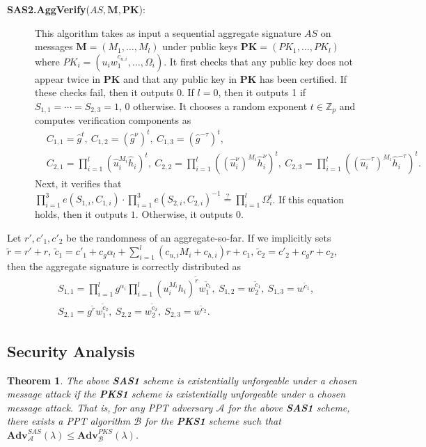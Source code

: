 \documentclass[11pt,letterpaper]{article}
\newcommand{\vect}[1]{\mathbf{#1}}
\newtheorem{theorem}{Theorem}[section]
\newcommand{\Z}{\mathbb{Z}}
\newcommand{\Adv}{\textbf{Adv}}
\newcommand{\mc}[1]{\mathcal{#1}}
\newcommand{\tb}[1]{\textbf{#1}}
\begin{document}
\begin{description}
\item [\tb{SAS2.AggVerify}($AS, \vect{M}, \vect{PK}$):] This algorithm
    takes as input a sequential aggregate signature $AS$ on messages
    $\vect{M} = (M_1, \ldots, M_l)$ under public keys $\vect{PK} = (PK_1,
    \ldots, PK_l)$ where $PK_i = (u_i w_1^{c_{u,i}}, \ldots, \Omega_i)$. It
    first checks that any public key does not appear twice in $\vect{PK}$
    and that any public key in $\vect{PK}$ has been certified. If these
    checks fail, then it outputs 0. If $l=0$, then it outputs 1 if $S_{1,1}
    = \cdots = S_{2,3} = 1$, 0 otherwise. It chooses a random exponent $t
    \in \Z_p$ and computes verification components as
    \begin{align*}
    &   C_{1,1} = \hat{g}^t,~
        C_{1,2} = (\hat{g}^{\nu})^t,~
        C_{1,3} = (\hat{g}^{-\tau})^t, \\
    &   C_{2,1} = \prod_{i=1}^l (\hat{u}_i^{M_i} \hat{h}_i)^t,~
        C_{2,2} = \prod_{i=1}^l ((\hat{u}_i^{\nu})^{M_i} \hat{h}_i^{\nu})^t,~
        C_{2,3} = \prod_{i=1}^l ((\hat{u}_i^{-\tau})^{M_i} \hat{h}_i^{-\tau})^t.
    \end{align*}
    Next, it verifies that $\prod_{i=1}^3 e(S_{1,i}, C_{1,i}) \cdot
    \prod_{i=1}^3 e(S_{2,i}, C_{2,i})^{-1} \stackrel{?}{=} \prod_{i=1}^l
    \Omega_i^t$. If this equation holds, then it outputs $1$. Otherwise, it
    outputs $0$.
\end{description}

Let $r', c'_1, c'_2$ be the randomness of an aggregate-so-far. If we
implicitly sets $\tilde{r} = r' + r,~ \tilde{c}_1 = c'_1 + c_g \alpha_l +
\sum_{i=1}^l (c_{u,i} M_i + c_{h,i}) r + c_1,~ \tilde{c}_2 = c'_2 + c_g r +
c_2$, then the aggregate signature is correctly distributed as
    \begin{align*}
    &   S_{1,1} = \prod_{i=1}^l g^{\alpha_i} \prod_{i=1}^l (u_i^{M_i} h_i)^{\tilde{r}}
                  w_1^{\tilde{c}_1},~
        S_{1,2} = w_2^{\tilde{c}_1},~
        S_{1,3} = w^{\tilde{c}_1}, \\
    &   S_{2,1} = g^{\tilde{r}} w_1^{\tilde{c}_2},~
        S_{2,2} = w_2^{\tilde{c}_2},~
        S_{2,3} = w^{\tilde{c}_2}.
    \end{align*}

\subsection{Security Analysis}

\begin{theorem} \label{thm:sas1-prime}
The above \tb{SAS1} scheme is existentially unforgeable under a chosen
message attack if the \tb{PKS1} scheme is existentially unforgeable under a
chosen message attack. That is, for any PPT adversary $\mc{A}$ for the above
\tb{SAS1} scheme, there exists a PPT algorithm $\mc{B}$ for the \tb{PKS1}
scheme such that
    $\Adv_{\mc{A}}^{SAS}(\lambda) \leq \Adv_{\mc{B}}^{PKS}(\lambda)$.
\end{theorem}
\end{document}
